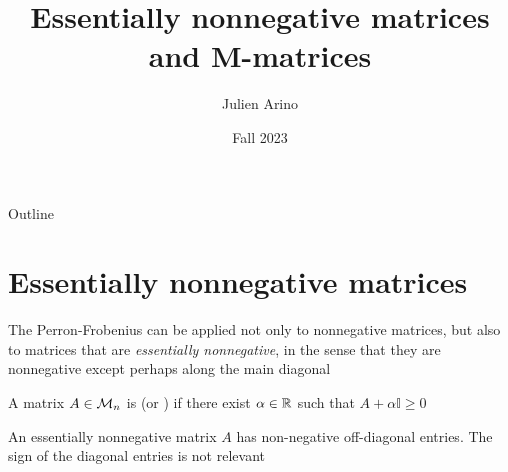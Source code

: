 \documentclass[aspectratio=169]{beamer}
\title{Essentially nonnegative matrices and M-matrices}
\author{Julien Arino}
\date{Fall 2023}
\begin{document}
\begin{frame}
	\titlepage
\end{frame}
\addtocounter{page}{-1}
  
  
\begin{frame}{Outline}
	  \tableofcontents[hideallsubsections]
\end{frame}
\addtocounter{page}{-1}


\section{Essentially nonnegative matrices}

\begin{frame}
The Perron-Frobenius can be applied not only to nonnegative matrices, but also to matrices that are \emph{essentially nonnegative}, in the sense that they are nonnegative except perhaps along the main diagonal
\vfill
\begin{definition}
A matrix $A\in \mathcal{M}_n$ is  (or ) if there exist $\alpha \in \mathbb{R}$ such that $A+\alpha \mathbb{I}\geq 0$
\end{definition}
\vfill
\begin{remark}
    An essentially nonnegative matrix $A$ has non-negative off-diagonal entries. The sign of the diagonal entries is not relevant
\end{remark}
\end{frame}
\end{document}
